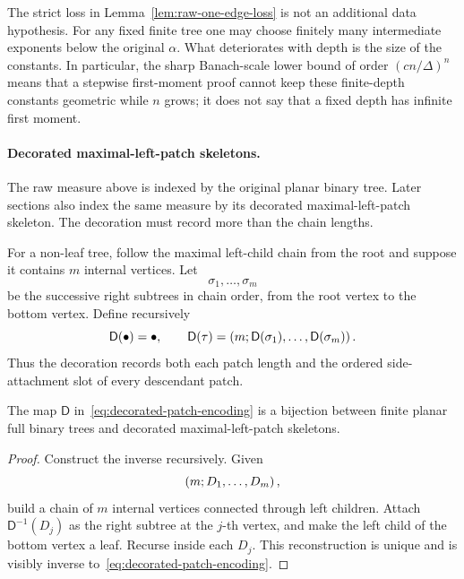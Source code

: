 The strict loss in Lemma~\ref{lem:raw-one-edge-loss} is not an additional data hypothesis. For any fixed finite tree one may choose finitely many intermediate exponents below the original $\alpha$. What deteriorates with depth is the size of the constants. In particular, the sharp Banach-scale lower bound of order $(cn/\Delta)^n$ means that a stepwise first-moment proof cannot keep these finite-depth constants geometric while $n$ grows; it does not say that a fixed depth has infinite first moment.

\paragraph{Decorated maximal-left-patch skeletons.}
The raw measure above is indexed by the original planar binary tree. Later sections also index the same measure by its decorated maximal-left-patch skeleton. The decoration must record more than the chain lengths.

For a non-leaf tree, follow the maximal left-child chain from the root and suppose it contains $m$ internal vertices. Let
\begin{equation*}
  \sigma_1,\ldots,\sigma_m
\end{equation*}
be the successive right subtrees in chain order, from the root vertex to the bottom vertex. Define recursively
\begin{equation*}
  \mathsf D(\bullet)=\bullet,
  \qquad
  \mathsf D(\tau)
  =
  \left(
    m;
    \mathsf D(\sigma_1),\ldots,\mathsf D(\sigma_m)
  \right).
  \label{eq:decorated-patch-encoding}
\end{equation*}
Thus the decoration records both each patch length and the ordered side-attachment slot of every descendant patch.

\begin{proposition}
\label{prop:tree-patch-bijection}
The map $\mathsf D$ in~\eqref{eq:decorated-patch-encoding} is a bijection between finite planar full binary trees and decorated maximal-left-patch skeletons.
\end{proposition}

\begin{proof}
Construct the inverse recursively. Given
\begin{equation*}
  \left(m;D_1,\ldots,D_m\right),
\end{equation*}
build a chain of $m$ internal vertices connected through left children. Attach $\mathsf D^{-1}(D_j)$ as the right subtree at the $j$-th vertex, and make the left child of the bottom vertex a leaf. Recurse inside each $D_j$. This reconstruction is unique and is visibly inverse to~\eqref{eq:decorated-patch-encoding}.
\end{proof}

